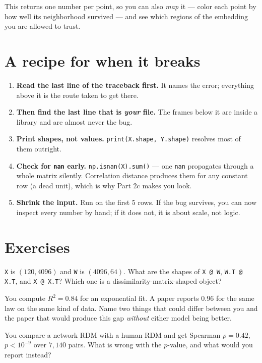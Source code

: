 \documentclass[11pt]{article}
\begin{document}
This returns one number per point, so you can also \emph{map} it --- color each
point by how well its neighborhood survived --- and see which regions of the
embedding you are allowed to trust.

\section{A recipe for when it breaks}

\begin{enumerate}
  \item \textbf{Read the last line of the traceback first.} It names the error;
        everything above it is the route taken to get there.
  \item \textbf{Then find the last line that is \emph{your} file.} The frames
        below it are inside a library and are almost never the bug.
  \item \textbf{Print shapes, not values.} \texttt{print(X.shape, Y.shape)}
        resolves most of them outright.
  \item \textbf{Check for \texttt{nan} early.} \texttt{np.isnan(X).sum()} ---
        one \texttt{nan} propagates through a whole matrix silently. Correlation
        distance produces them for any constant row (a dead unit), which is why
        Part 2c makes you look.
  \item \textbf{Shrink the input.} Run on the first 5 rows. If the bug survives,
        you can now inspect every number by hand; if it does not, it is about
        scale, not logic.
\end{enumerate}

\section{Exercises}

 \texttt{X} is $(120, 4096)$ and \texttt{W} is $(4096, 64)$. What are
the shapes of \texttt{X @ W}, \texttt{W.T @ X.T}, and \texttt{X @ X.T}? Which
one is a dissimilarity-matrix-shaped object?

 You compute $R^2 = 0.84$ for an exponential fit. A paper reports
$0.96$ for the same law on the same kind of data. Name two things that could
differ between you and the paper that would produce this gap \emph{without}
either model being better.

 You compare a network RDM with a human RDM and get Spearman
$\rho = 0.42$, $p < 10^{-9}$ over $7{,}140$ pairs. What is wrong with the
$p$-value, and what would you report instead?
\end{document}

